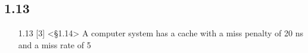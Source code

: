 \documentclass{article}
\begin{document}
\subsection*{1.13}
\begin{enumerate}
    \item[1.13] [3] <§1.14> A computer system has a cache with a miss penalty of 20 ns and a miss rate of 5%
\end{enumerate}
\end{document}
